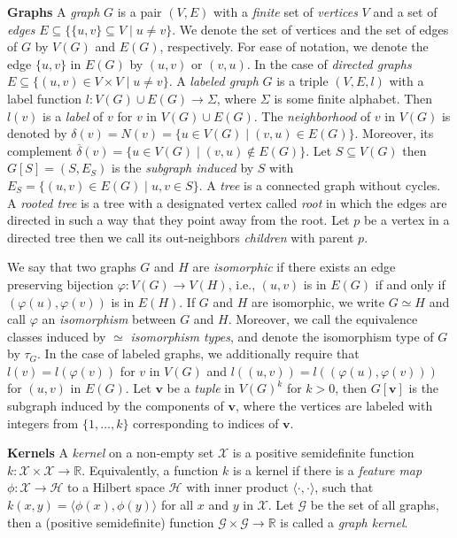 \documentclass{article}
\newcommand{\xhdr}[1]{{\noindent\bfseries #1}}
\theoremstyle{definition}
\newcommand{\new}[1]{\emph{#1}}
\newcommand{\ndelta}{\ensuremath{\overline{\delta}}}
\renewcommand{\vec}[1]{\mathbf{#1}}
\begin{document}
\xhdr{Graphs} A \new{graph} $G$ is a pair $(V,E)$ with a \emph{finite} set of
\new{vertices} $V$ and a set of \new{edges} $E \subseteq \{ \{u,v\}
\subseteq V \mid u \neq v \}$. We denote the set of vertices and the set
of edges of $G$ by $V(G)$ and $E(G)$, respectively. For ease of
notation, we denote the edge $\{u,v\}$ in $E(G)$ by $(u,v)$ or
$(v,u)$. In the case of \emph{directed graphs} $E \subseteq \{ (u,v)
\in V \times V \mid u \neq v \}$. A \new{labeled graph} $G$ is a triple
$(V,E,l)$ with a label function $l \colon V(G) \cup E(G) \to \Sigma$,
where $\Sigma$ is some finite alphabet. Then $l(v)$ is a
\new{label} of $v$ for $v$ in $V(G) \cup E(G)$. 
The \new{neighborhood} 
of $v$ in $V(G)$ is denoted by $\delta(v) = N(v) = \{ u \in V(G) \mid (v, u) \in E(G) \}$. 
Moreover, its complement $\ndelta(v) = \{ u \in V(G) \mid (v, u) \notin E(G) \}$. 
Let $S \subseteq
V(G)$ then $G[S] = (S,E_S)$ is the \new{subgraph induced} by $S$ with
$E_S = \{ (u,v) \in E(G) \mid u,v \in S \}$. A \new{tree} is a connected graph without
cycles. A \new{rooted tree} is a tree with a designated vertex called \new{root} in which the edges are directed in such a way that they point away from the root. 
Let $p$ be a vertex in a directed tree then we call its out-neighbors \new{children} with parent $p$. 

We say that two graphs $G$ and $H$
are \new{isomorphic} if there exists an edge preserving bijection
$\varphi \colon V(G) \to V(H)$, i.e., $(u,v)$ is in $E(G)$ if and only if
$(\varphi(u),\varphi(v))$ is in $E(H)$. If $G$ and $H$ are isomorphic,
we write $G \simeq H$ and call $\varphi$ an \new{isomorphism} between
$G$ and $H$. Moreover, we call the equivalence classes induced by
$\simeq$ \emph{isomorphism types}, and denote the isomorphism type of $G$ by
$\tau_G$. In the case of labeled graphs, we additionally require that
$l(v) = l(\varphi(v))$ for $v$ in $V(G)$ and $l((u,v)) = l((\varphi(u), \varphi(v)))$ for $(u,v)$ in $E(G)$. 
Let $\vec{v}$ be a \emph{tuple} in $V(G)^k$ for $k > 0$, then $G[\vec{v}]$ is the subgraph induced by the components of $\vec{v}$, where the vertices are labeled with integers from $\{ 1, \dots, k \}$ corresponding to indices of $\vec{v}$. 

\xhdr{Kernels} A \emph{kernel} on a non-empty set $\mathcal{X}$ is a positive semidefinite function 
$k \colon \mathcal{X} \times \mathcal{X} \to \mathbb{R}$.
Equivalently, a function $k$ is a kernel if there is a \emph{feature map} 
$\phi \colon \mathcal{X} \to \mathcal{H}$ to a Hilbert space $\mathcal{H}$ with inner product 
$\langle \cdot, \cdot \rangle$, such that 
$k(x,y) = \langle \phi(x),\phi(y) \rangle$ for all $x$ and $y$ in $\mathcal{X}$.
Let $\mathcal{G}$ be the set of all graphs, then a (positive semidefinite) function $\mathcal{G} \times \mathcal{G} \to \mathbb{R}$ is called a \emph{graph kernel}.
\end{document}
